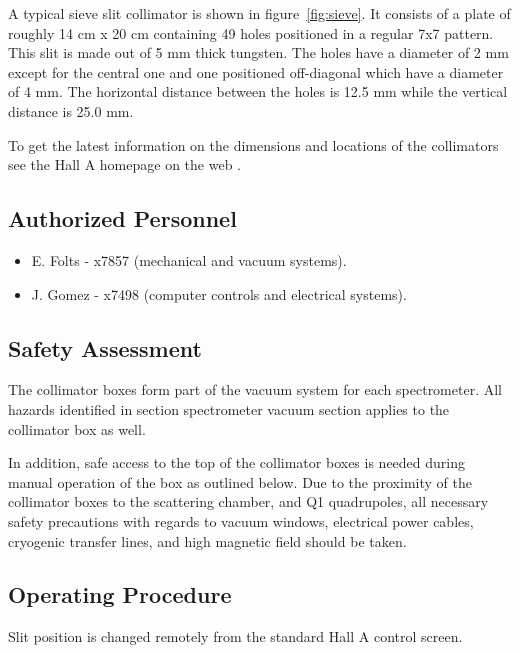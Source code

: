 A typical sieve slit collimator is shown in figure~\ref{fig:sieve}. It consists of 
a plate of roughly 14 cm x 20 cm containing 49 holes
positioned in a regular 7x7 pattern. This slit is made out of 5
mm thick tungsten.
The holes have a diameter of 2 mm except for the central one and one positioned
off-diagonal which have a diameter of 4 mm. The horizontal distance between the
holes is 12.5 mm while the vertical distance is 25.0 mm.

To get the latest information on the dimensions and locations of the collimators see 
the Hall A homepage on the web%
.

\subsection{Authorized  Personnel} 

\begin{itemize} 
\item[~]E. Folts - x7857 (mechanical and vacuum systems).
\item[~]J. Gomez - x7498 (computer controls and electrical systems).
\end{itemize} 

\subsection{Safety Assessment}

The collimator boxes form part of the vacuum system for each spectrometer. All hazards
identified in section spectrometer vacuum section applies to the collimator box as well.

In addition, safe access to the top of
the collimator boxes is needed  during manual operation of the box as outlined below.
Due to the proximity of the collimator boxes to the scattering chamber, and Q1 quadrupoles,
all necessary safety precautions with regards to vacuum windows, electrical power cables, 
cryogenic transfer lines, and high magnetic field should be taken.

\subsection{Operating Procedure}
Slit position is changed remotely from the standard Hall A control screen.
%
